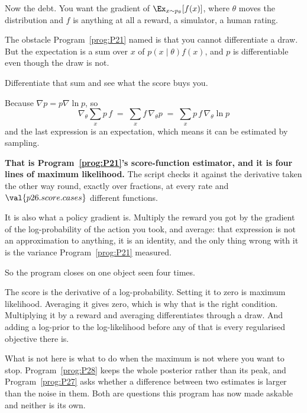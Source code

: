 \begin{fr}
Now the debt. You want the gradient of $\Ex_{x \sim p_\theta}[f(x)]$, where
$\theta$ moves the distribution and $f$ is anything at all \dash{} a reward,
a simulator, a human rating.

The obstacle Program~\ref{prog:P21} named is that you cannot differentiate a
draw. But the expectation is a sum over $x$ of $p(x \mid \theta) f(x)$, and
$p$ is differentiable even though the draw is not.

Differentiate that sum and see what the score buys you.
\dotline
\nextframe
\end{fr}

\begin{fr}

Because $\nabla p = p \nabla \ln p$, so
\[ \nabla_\theta \sum_x p\,f
   \;=\; \sum_x f\,\nabla_\theta p
   \;=\; \sum_x p\, f\, \nabla_\theta \ln p \]
and the last expression is an expectation, which means it can be estimated by
sampling.

\textbf{That is Program~\ref{prog:P21}'s score-function estimator, and it is
four lines of maximum likelihood.} The script checks it against the
derivative taken the other way round, exactly over fractions, at every rate
and $\val{p26.score.cases}$ different functions.

It is also what a policy gradient is. Multiply the reward you got by the
gradient of the log-probability of the action you took, and average: that
expression is not an approximation to anything, it is an identity, and the
only thing wrong with it is the variance Program~\ref{prog:P21} measured.
\end{fr}

\begin{fr}
So the program closes on one object seen four times.

The score is the derivative of a log-probability. Setting it to zero is
maximum likelihood. Averaging it gives zero, which is why that is the right
condition. Multiplying it by a reward and averaging differentiates through a
draw. And adding a log-prior to the log-likelihood before any of that is
every regularised objective there is.


What is not here is what to do when the maximum is not where you want to
stop. Program~\ref{prog:P28} keeps the whole posterior rather than its peak,
and Program~\ref{prog:P27} asks whether a difference between two estimates is
larger than the noise in them. Both are questions this program has now made
askable and neither is its own.
\end{fr}

